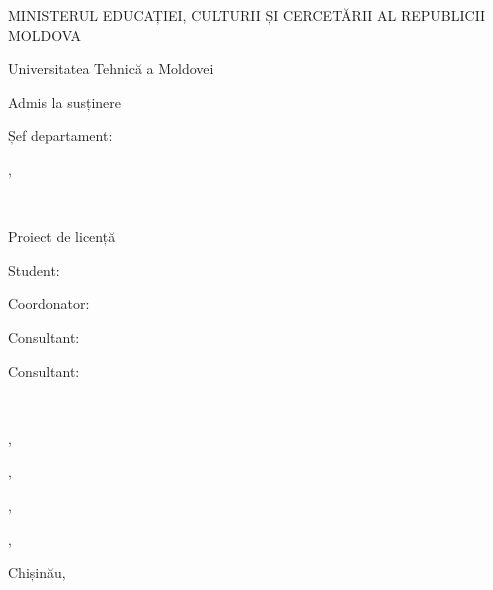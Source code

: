 




\begin{titlepage}
	\begin{titlepagefont}
	    \centering
	    \bfseries

        {MINISTERUL EDUCAȚIEI, CULTURII ȘI CERCETĂRII AL REPUBLICII MOLDOVA \par}
        {Universitatea Tehnică a Moldovei \par}
        {\facultyname \par}
        {\departmentname \par}

    	\vfill
    	
    	\hfill
    	\begin{minipage}{0.35\textwidth}
    	    \raggedleft
        	{\small Admis la susținere \par}
        	{\small Șef departament: \par}
        	{\small \chairmanname, \chairmantitle \par}
        	\bigskip
        	{\small \dotfill \par}
        	\medskip
        	{\small \dotfill\ \degreeyear \par}
        \end{minipage}
    	
    	\vfill
    	
    	{\LARGE \titlero \par}
    	{\Large Proiect de licență \par}
    	
    	\vfill
    	
    	\hfill
        \begin{minipage}{0.25\textwidth}
            \raggedright
            {Student: \par}
            {Coordonator: \par}
            {Consultant: \par}
            {Consultant: \par}
	    \end{minipage}
	    ~
	    \begin{minipage}{0.45\textwidth}
	        \raggedleft
	        {\authorname, \authorgroup \par}
	        {\supername, \supertitle \par}
	        {\consultantonename, \consultantonetitle \par}
	        {\consultanttwoname, \consultanttwotitle \par}
	    \end{minipage}
    	
    	\vfill

    	{Chișinău, \degreeyear \par}
	
	\end{titlepagefont}
\end{titlepage}
